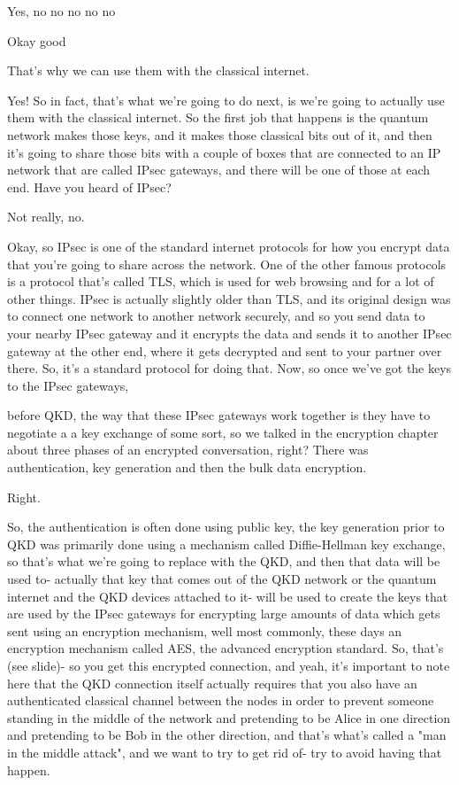 Yes, no no no no no

Okay good

That's why we can use them with the classical internet.

Yes! So in fact, that's what we're going to do next, is we're going to actually use them with the classical internet. So the first job that happens is the quantum network makes those keys, and it makes those classical bits out of it, and then it's going to share those bits with a couple of boxes that are connected to an IP network that are called IPsec gateways, and there will be one of those at each end. Have you heard of IPsec?

Not really, no.

Okay, so IPsec is one of the standard internet protocols for how you encrypt data that you're going to share across the network. One of the other famous protocols is a protocol that's called TLS, which is used for web browsing and for a lot of other things. IPsec is actually slightly older than TLS, and its original design was to connect one network to another network securely, and so you send data to your nearby IPsec gateway and it encrypts the data and sends it to another IPsec gateway at the other end, where it gets decrypted and sent to your partner over there. So, it's a standard protocol for doing that. Now, so once we've got the keys to the IPsec gateways,

before QKD, the way that these IPsec gateways work together is they have to negotiate a a key exchange of some sort, so we talked in the encryption chapter about three phases of an encrypted conversation, right? There was authentication, key generation and then the bulk data encryption.

Right.

So, the authentication is often done using public key, the key generation prior to QKD was primarily done using a mechanism called Diffie-Hellman key exchange, so that's what we're going to replace with the QKD, and then that data will be used to- actually that key that comes out of the QKD network or the quantum internet and the QKD devices attached to it- will be used to create the keys that are used by the IPsec gateways for encrypting large amounts of data which gets sent using an encryption mechanism, well most commonly, these days an encryption mechanism called AES, the advanced encryption standard. So, that's (see slide)- so you get this encrypted connection, and yeah, it's important to note here that the QKD connection itself actually requires that you also have an authenticated classical channel between the nodes in order to prevent someone standing in the middle of the network and pretending to be Alice in one direction and pretending to be Bob in the other direction, and that's what's called a "man in the middle attack", and we want to try to get rid of- try to avoid having that happen.

